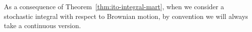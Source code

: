 As a consequence of Theorem~\ref{thm:ito-integral-mart}, when we consider a stochastic integral with respect to Brownian motion, by convention we will always take a continuous version.

